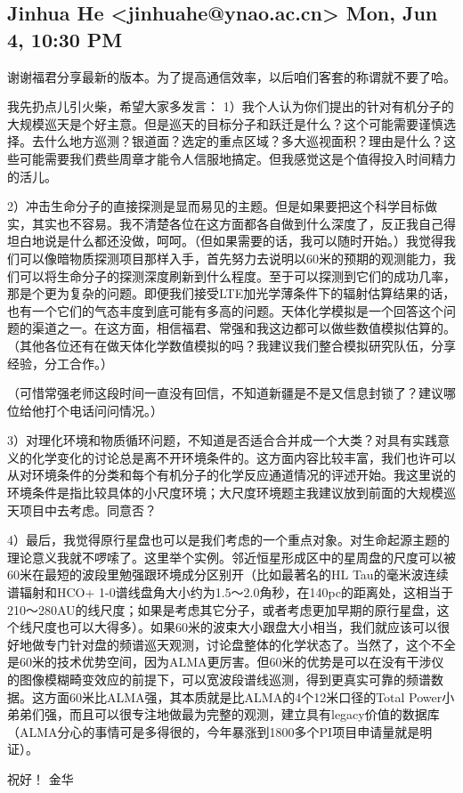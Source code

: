 \documentclass{article}
\newcommand\from[2]{\subsection{{#1} {#2}}}
\newcommand\said[1]{#1}
\begin{document}
\from{Jinhua He <jinhuahe@ynao.ac.cn>}{Mon, Jun 4, 10:30 PM}
\said{
谢谢福君分享最新的版本。为了提高通信效率，以后咱们客套的称谓就不要了哈。

我先扔点儿引火柴，希望大家多发言：
1）我个人认为你们提出的针对有机分子的大规模巡天是个好主意。但是巡天的目标分子和跃迁是什么？这个可能需要谨慎选择。去什么地方巡测？银道面？选定的重点区域？多大巡视面积？理由是什么？这些可能需要我们费些周章才能令人信服地搞定。但我感觉这是个值得投入时间精力的活儿。

2）冲击生命分子的直接探测是显而易见的主题。但是如果要把这个科学目标做实，其实也不容易。我不清楚各位在这方面都各自做到什么深度了，反正我自己得坦白地说是什么都还没做，呵呵。（但如果需要的话，我可以随时开始。）我觉得我们可以像暗物质探测项目那样入手，首先努力去说明以60米的预期的观测能力，我们可以将生命分子的探测深度刷新到什么程度。至于可以探测到它们的成功几率，那是个更为复杂的问题。即便我们接受LTE加光学薄条件下的辐射估算结果的话，也有一个它们的气态丰度到底可能有多高的问题。天体化学模拟是一个回答这个问题的渠道之一。在这方面，相信福君、常强和我这边都可以做些数值模拟估算的。（其他各位还有在做天体化学数值模拟的吗？我建议我们整合模拟研究队伍，分享经验，分工合作。）

（可惜常强老师这段时间一直没有回信，不知道新疆是不是又信息封锁了？建议哪位给他打个电话问问情况。）

3）对理化环境和物质循环问题，不知道是否适合合并成一个大类？对具有实践意义的化学变化的讨论总是离不开环境条件的。这方面内容比较丰富，我们也许可以从对环境条件的分类和每个有机分子的化学反应通道情况的评述开始。我这里说的环境条件是指比较具体的小尺度环境；大尺度环境题主我建议放到前面的大规模巡天项目中去考虑。同意否？

4）最后，我觉得原行星盘也可以是我们考虑的一个重点对象。对生命起源主题的理论意义我就不啰嗦了。这里举个实例。邻近恒星形成区中的星周盘的尺度可以被60米在最短的波段里勉强跟环境成分区别开（比如最著名的HL Tau的毫米波连续谱辐射和HCO+ 1-0谱线盘角大小约为1.5～2.0角秒，在140pc的距离处，这相当于210～280AU的线尺度；如果是考虑其它分子，或者考虑更加早期的原行星盘，这个线尺度也可以大得多）。如果60米的波束大小跟盘大小相当，我们就应该可以很好地做专门针对盘的频谱巡天观测，讨论盘整体的化学状态了。当然了，这个不全是60米的技术优势空间，因为ALMA更厉害。但60米的优势是可以在没有干涉仪的图像模糊畸变效应的前提下，可以宽波段谱线巡测，得到更真实可靠的频谱数据。这方面60米比ALMA强，其本质就是比ALMA的4个12米口径的Total Power小弟弟们强，而且可以很专注地做最为完整的观测，建立具有legacy价值的数据库（ALMA分心的事情可是多得很的，今年暴涨到1800多个PI项目申请量就是明证）。

祝好！
金华
}
\end{document}
